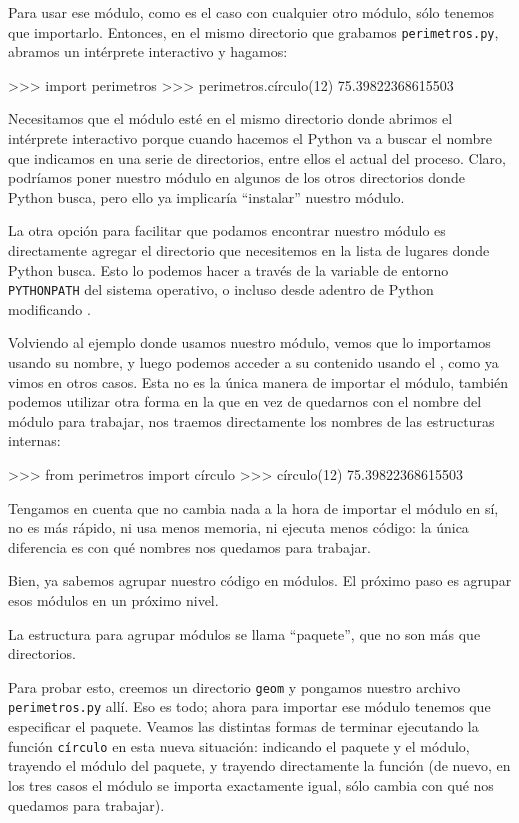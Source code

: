 Para usar ese módulo, como es el caso con cualquier otro módulo, sólo tenemos que importarlo. Entonces, en el mismo directorio que grabamos \texttt{perimetros.py}, abramos un intérprete interactivo y hagamos:

\begin{py}  
>>> import perimetros
>>> perimetros.círculo(12)
75.39822368615503
\end{py}

Necesitamos que el módulo esté en el mismo directorio donde abrimos el intérprete interactivo porque cuando hacemos el  Python va a buscar el nombre que indicamos en una serie de directorios, entre ellos el actual del proceso. Claro, podríamos poner nuestro módulo en algunos de los otros directorios donde Python busca, pero ello ya implicaría ``instalar'' nuestro módulo.

La otra opción para facilitar que podamos encontrar nuestro módulo es directamente agregar el directorio que necesitemos en la lista de lugares donde Python busca. Esto lo podemos hacer a través de la variable de entorno \texttt{PYTHONPATH} del sistema operativo, o incluso desde adentro de Python modificando .

Volviendo al ejemplo donde usamos nuestro módulo, vemos que lo importamos usando su nombre, y luego podemos acceder a su contenido usando el , como ya vimos en otros casos. Esta no es la única manera de importar el módulo, también podemos utilizar otra forma en la que en vez de quedarnos con el nombre del módulo para trabajar, nos traemos directamente los nombres de las estructuras internas:

\begin{py}  
>>> from perimetros import círculo
>>> círculo(12)
75.39822368615503
\end{py}

Tengamos en cuenta que no cambia nada a la hora de importar el módulo en sí, no es más rápido, ni usa menos memoria, ni ejecuta menos código: la única diferencia es con qué nombres nos quedamos para trabajar.

Bien, ya sabemos agrupar nuestro código en módulos. El próximo paso es agrupar esos módulos en un próximo nivel.

La estructura para agrupar módulos se llama ``paquete'', que no son más que directorios.

Para probar esto, creemos un directorio \texttt{geom} y pongamos nuestro archivo \texttt{perimetros.py} allí. Eso es todo; ahora para importar ese módulo tenemos que especificar el paquete. Veamos las distintas formas de terminar ejecutando la función \texttt{círculo} en esta nueva situación: indicando el paquete y el módulo, trayendo el módulo del paquete, y trayendo directamente la función (de nuevo, en los tres casos el módulo se importa exactamente igual, sólo cambia con qué nos quedamos para trabajar).

